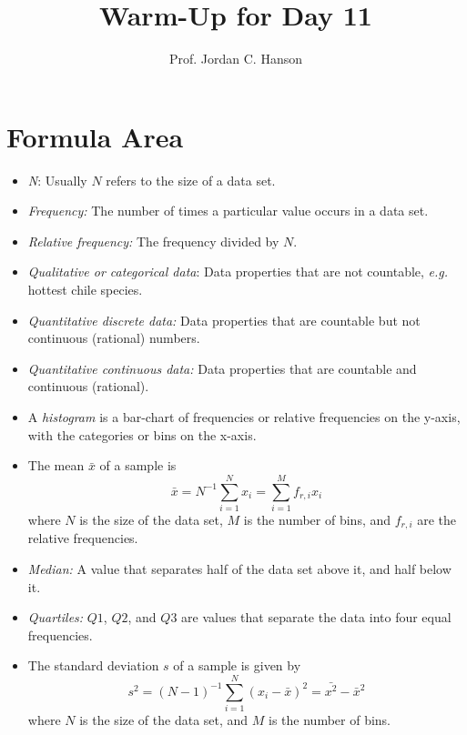\documentclass{article}
\begin{document}
\title{Warm-Up for Day 11}
\author{Prof. Jordan C. Hanson}

\maketitle

\section{Formula Area}

\begin{itemize}
\item \textit{N}: Usually $N$ refers to the size of a data set.
\item \textit{Frequency:} The number of times a particular value occurs in a data set.
\item \textit{Relative frequency:} The frequency divided by $N$.
\item \textit{Qualitative or categorical data}: Data properties that are not countable, \textit{e.g.} hottest chile species.
\item \textit{Quantitative discrete data:} Data properties that are countable but not continuous (rational) numbers.
\item \textit{Quantitative continuous data:} Data properties that are countable and continuous (rational).
\item A \textit{histogram} is a bar-chart of frequencies or relative frequencies on the y-axis, with the categories or bins on the x-axis.
\item The mean $\bar{x}$ of a sample is 
\begin{equation}
\bar{x} = N^{-1} \sum_{i=1}^N x_i = \sum_{i=1}^M f_{r,i} x_i
\end{equation}
where $N$ is the size of the data set, $M$ is the number of bins, and $f_{r,i}$ are the relative frequencies.
\item \textit{Median:} A value that separates half of the data set above it, and half below it.
\item \textit{Quartiles:} $Q1$, $Q2$, and $Q3$ are values that separate the data into four equal frequencies.
\item The standard deviation $s$ of a sample is given by
\begin{equation}
s^2 = (N-1)^{-1} \sum_{i=1}^N (x_i-\bar{x})^2 = \bar{x^2} - \bar{x}^2
\end{equation}
where $N$ is the size of the data set, and $M$ is the number of bins.
\end{itemize}
\end{document}
